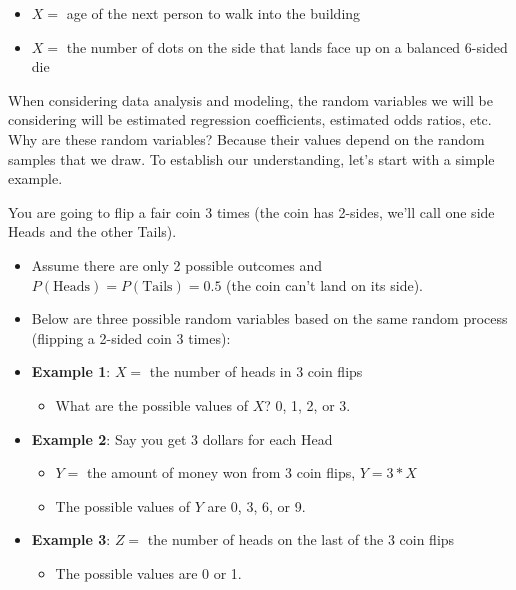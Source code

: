 \documentclass[]{book}
\providecommand{\tightlist}{%
  \setlength{\itemsep}{0pt}\setlength{\parskip}{0pt}}
\begin{document}
\begin{itemize}
\tightlist
\item
  \(X =\) age of the next person to walk into the building
\item
  \(X =\) the number of dots on the side that lands face up on a balanced 6-sided die
\end{itemize}

When considering data analysis and modeling, the random variables we will be considering will be estimated regression coefficients, estimated odds ratios, etc. Why are these random variables? Because their values depend on the random samples that we draw. To establish our understanding, let's start with a simple example.

You are going to flip a fair coin 3 times (the coin has 2-sides, we'll call one side Heads and the other Tails).

\begin{itemize}
\item
  Assume there are only 2 possible outcomes and \(P(\text{Heads}) = P(\text{Tails}) = 0.5\) (the coin can't land on its side).
\item
  Below are three possible random variables based on the same random process (flipping a 2-sided coin 3 times):
\item
  \textbf{Example 1}: \(X =\) the number of heads in 3 coin flips

  \begin{itemize}
  \tightlist
  \item
    What are the possible values of \(X\)? 0, 1, 2, or 3.
  \end{itemize}
\item
  \textbf{Example 2}: Say you get 3 dollars for each Head

  \begin{itemize}
  \tightlist
  \item
    \(Y =\) the amount of money won from 3 coin flips, \(Y = 3*X\)
  \item
    The possible values of \(Y\) are 0, 3, 6, or 9.
  \end{itemize}
\item
  \textbf{Example 3}: \(Z =\) the number of heads on the last of the 3 coin flips

  \begin{itemize}
  \tightlist
  \item
    The possible values are 0 or 1.
  \end{itemize}
\end{itemize}
\end{document}
